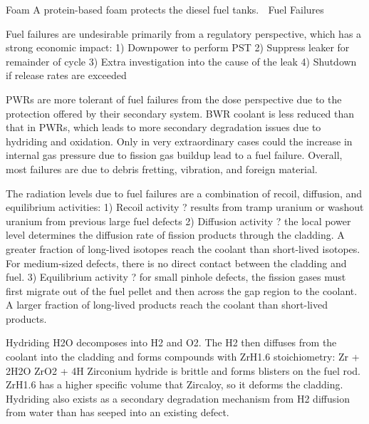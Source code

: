 \documentclass[10pt]{article}
\begin{document}
Foam
A protein-based foam protects the diesel fuel tanks. 

Fuel Failures

Fuel failures are undesirable primarily from a regulatory perspective, which has a strong economic impact:
1)	Downpower to perform PST
2)	Suppress leaker for remainder of cycle
3)	Extra investigation into the cause of the leak
4)	Shutdown if release rates are exceeded

PWRs are more tolerant of fuel failures from the dose perspective due to the protection offered by their secondary system. BWR coolant is less reduced than that in PWRs, which leads to more secondary degradation issues due to hydriding and oxidation. Only in very extraordinary cases could the increase in internal gas pressure due to fission gas buildup lead to a fuel failure. Overall, most failures are due to debris fretting, vibration, and foreign material. 

The radiation levels due to fuel failures are a combination of recoil, diffusion, and equilibrium activities:
1)	Recoil activity ? results from tramp uranium or washout uranium from previous large fuel defects
2)	Diffusion activity ? the local power level determines the diffusion rate of fission products through the cladding. A greater fraction of long-lived isotopes reach the coolant than short-lived isotopes. For medium-sized defects, there is no direct contact between the cladding and fuel.
3)	Equilibrium activity ? for small pinhole defects, the fission gases must first migrate out of the fuel pellet and then across the gap region to the coolant. A larger fraction of long-lived products reach the coolant than short-lived products. 

Hydriding
H2O decomposes into H2 and O2. The H2 then diffuses from the coolant into the cladding and forms compounds with ZrH1.6 stoichiometry:
Zr + 2H2O  ZrO2 + 4H
 Zirconium hydride is brittle and forms blisters on the fuel rod. ZrH1.6 has a higher specific volume that Zircaloy, so it deforms the cladding. Hydriding also exists as a secondary degradation mechanism from H2 diffusion from water than has seeped into an existing defect. 
\end{document}
